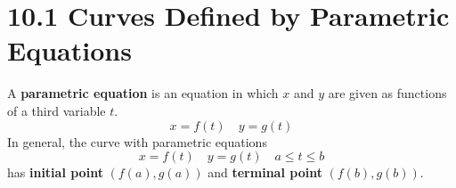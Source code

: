 %
%

\section*{10.1 Curves Defined by Parametric Equations}

A \textbf{parametric equation} is an equation in which \(x\) and \(y\) are given as functions of a third variable \(t\).
\[ x=f(t) \quad y=g(t) \]
In general, the curve with parametric equations
\[x=f(t) \quad y=g(t) \quad a \leq t \leq b\]
has \textbf{initial point} \((f(a), g(a))\) and \textbf{terminal point} \((f(b), g(b))\).
